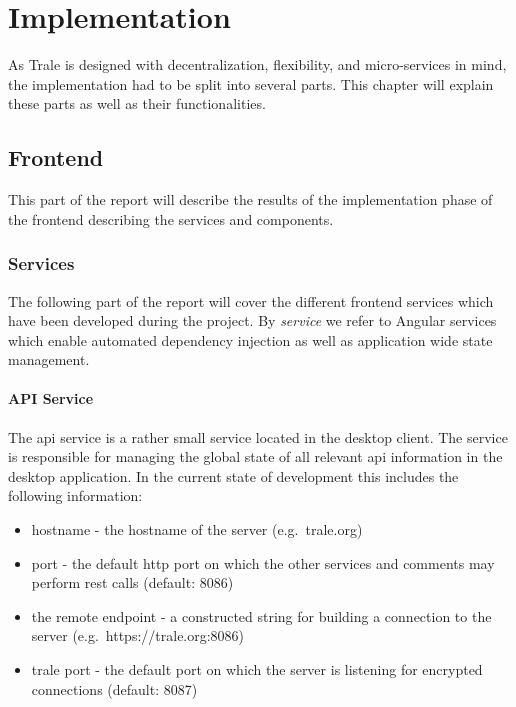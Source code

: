 

\chapter{Implementation}\label{ch:implementation}
As Trale is designed with decentralization, flexibility, and micro-services in mind, the implementation had to be split
into several parts.
This chapter will explain these parts as well as their functionalities.

\section{Frontend}\label{sec:frontend}

This part of the report will describe the results of the implementation phase of the frontend describing the services
and components.

\subsection{Services}\label{subsec:services}

The following part of the report will cover the different frontend services which have been developed during the
project.
By \textit{service} we refer to Angular services which enable automated dependency injection as well as application
wide state management.

\subsubsection{API Service}\label{subsubsec:api-service}

The \ac{api} service is a rather small service located in the desktop client.
The service is responsible for managing the global state of all relevant \ac{api} information in the desktop
application.
In the current state of development this includes the following information:

\begin{itemize}\setlength\itemsep{-0.5em}
    \item hostname - the hostname of the server (e.g.\ trale.org)
    \item port - the default \ac{http} port on which the other services and comments may perform \ac{rest} calls
        (default: 8086)
    \item the remote endpoint - a constructed string for building a connection to the server
        (e.g.\ https://trale.org:8086)
    \item trale port - the default port on which the server is listening for encrypted connections (default: 8087)
\end{itemize}

